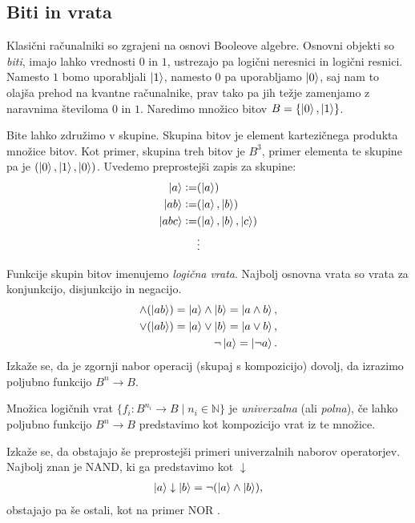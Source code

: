 \documentclass[mat1]{fmfdelo}
\newcommand{\N}{\mathbb N}
\newcommand{\defeq}{\vcentcolon=}
\begin{document}
\subsection{Biti in vrata}
Klasični računalniki so zgrajeni na osnovi Booleove algebre. Osnovni objekti so \emph{biti}, imajo lahko vrednosti \(0\) in \(1\), ustrezajo pa logični neresnici in logični resnici. Namesto \(1\) bomo uporabljali \(\ket{1}\), namesto \(0\) pa uporabljamo \(\ket{0}\), saj nam to olajša prehod na kvantne računalnike, prav tako pa jih težje zamenjamo z naravnima številoma \(0\) in \(1\). Naredimo množico bitov \(B = \{\ket0, \ket1\}\).

Bite lahko združimo v skupine. Skupina bitov je element kartezičnega produkta množice bitov. Kot primer, skupina treh bitov je \(B^3\), primer elementa te skupine pa je \((\ket0, \ket1, \ket0)\). Uvedemo preprostejši zapis za skupine: 
\begin{align*}
    \ket{a} \defeq& (\ket a)\\
    \ket{ab} \defeq& (\ket{a},\ket b)\\
    \ket{abc} \defeq& (\ket a, \ket b, \ket c)\\
    &\vdots
\end{align*}

Funkcije skupin bitov imenujemo \emph{logična vrata}. Najbolj osnovna vrata so vrata za konjunkcijo, disjunkcijo in negacijo.
\begin{align*}
    \land(\ket{ab}) = \ket{a}\land\ket{b} = \ket{a\land b},\\
    \lor(\ket{ab}) = \ket{a}\lor\ket{b} = \ket{a\lor b},\\
    \lnot\ket{a} = \ket{\lnot a}.
\end{align*}
Izkaže se, da je zgornji nabor operacij (skupaj s kompozicijo) dovolj, da izrazimo poljubno funkcijo \(B^n\to B\).
\begin{definicija}
    Množica logičnih vrat \(\{f_i: B^{n_i}\to B \mid n_i\in \N\}\) je \emph{univerzalna} (ali \emph{polna}), če lahko poljubno funkcijo \(B^n\to B\) predstavimo kot kompozicijo vrat iz te množice.
\end{definicija}
Izkaže se, da obstajajo še preprostejši primeri univerzalnih naborov operatorjev. Najbolj znan je \textsf{NAND}, ki ga predstavimo kot \(\downarrow\)
\begin{align*}
    \ket{a}\downarrow \ket{b} = \lnot (\ket{a} \land \ket{b}),
\end{align*}
obstajajo pa še ostali, kot na primer \textsf{NOR} \cite{sheffers}.
\end{document}
